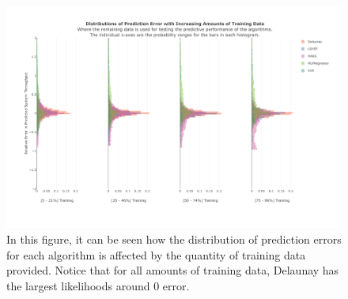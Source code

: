 \documentclass{scspaperproc}
\theoremstyle{scsthe}
\begin{document}

\begin{figure}
  \centering
  \includegraphics[width=\textwidth]{Prediction_Performance_TT_Ratio.pdf}
  \caption{In this figure, it can be seen how the distribution of
    prediction errors for each algorithm is affected by the quantity
    of training data provided. Notice that for all amounts of training
    data, Delaunay has the largest likelihoods around 0 error.}
  \label{fig:tt_ratio}
\end{figure}
\end{document}
